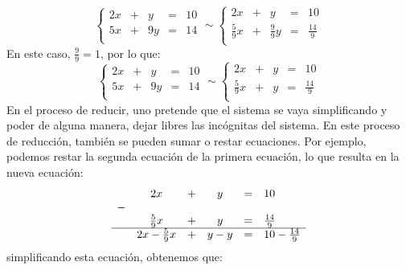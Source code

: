 \documentclass[12pt]{report}
\theoremstyle{largebreak}
\begin{document}
    \begin{equation*}
        \left\{
            \begin{array}{ccccc}
                2x & + & y & = & 10 \\
                5x & + & 9y & = & 14 \\
            \end{array}
        \right.\sim \left\{
            \begin{array}{ccccl}
                2x & + & y & = & 10 \\
                \frac{5}{9}x & + & \frac{9}{9}y & = & \frac{14}{9} \\
            \end{array}
        \right.
    \end{equation*}
    En este caso, $\frac{9}{9}=1$, por lo que:
    \begin{equation}
        \left\{
            \begin{array}{ccccc}
                2x & + & y & = & 10 \\
                5x & + & 9y & = & 14 \\
            \end{array}
        \right.\sim \left\{
            \begin{array}{ccccl}
                2x & + & y & = & 10 \\
                \frac{5}{9}x & + & y & = & \frac{14}{9} \\
            \end{array}
        \right.
    \end{equation}
    En el proceso de reducir, uno pretende que el sistema se vaya simplificando y poder de alguna manera, dejar libres las incógnitas del sistema. En este proceso de reducción, también se pueden sumar o restar ecuaciones. Por ejemplo, podemos restar la segunda ecuación de la primera ecuación, lo que resulta en la nueva ecuación:
    \begin{equation*}
        \begin{array}{cccccl}
            & 2x & + & y & = & 10 \\
            - &  &  &  & & \\
            & \frac{5}{9}x & + & y & = & \frac{14}{9} \\
            \hline
            & 2x-\frac{5}{9}x & + & y-y & = & 10-\frac{14}{9} \\
        \end{array}
    \end{equation*}
    simplificando esta ecuación, obtenemos que:
\end{document}
